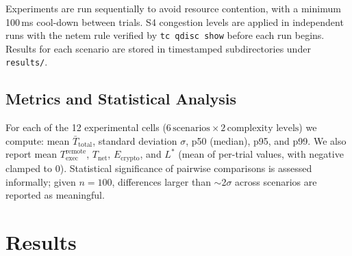 \documentclass[10pt,twocolumn]{article}
\begin{document}
Experiments are run sequentially to avoid resource contention, with a
minimum 100\,ms cool-down between trials.  S4 congestion levels are applied
in independent runs with the netem rule verified by \texttt{tc qdisc show}
before each run begins.  Results for each scenario are stored in timestamped
subdirectories under \texttt{results/}.

\subsection{Metrics and Statistical Analysis}

For each of the 12 experimental cells ($6\,\text{scenarios} \times 2\,
\text{complexity levels}$) we compute:
mean $\bar{T}_{\text{total}}$, standard deviation $\sigma$, p50 (median),
p95, and p99.  We also report mean $T_{\text{exec}}^{\text{remote}}$,
$T_{\text{net}}$, $E_{\text{crypto}}$, and $L^*$ (mean of per-trial values,
with negative clamped to 0).  Statistical significance of pairwise comparisons
is assessed informally; given $n=100$, differences larger than $\sim$2$\sigma$
across scenarios are reported as meaningful.

\section{Results}
\label{sec:results}
\end{document}
